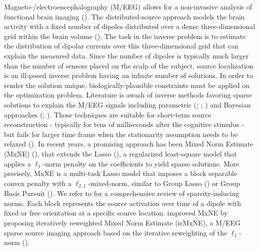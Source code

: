 Magneto-/electroencephalography (M/EEG) allows for a non-invasive analysis of
functional brain imaging (\cite{Baillet_Mosher_Leahy_2001}). The distributed-source approach models the brain activity
with a fixed number of dipoles distributed over a dense three-dimensional 
grid within the brain volume (\cite{Dale_Sereno_1993}). The task in the inverse problem is to estimate the 
distribution of dipolar currents over this three-dimensional grid that can explain the 
measured data. Since the number of dipoles is typically much larger than the number 
of sensors placed on the scalp of the subject, source localization is an 
ill-posed inverse problem having an infinite number of solutions. In order to render
the solution unique, biologically-plausible constraints must be applied on the optimization
problem. Literature is awash of inverse methods favoring sparse solutions to explain the
M/EEG signals including parametric (\cite{Huang_Breheny_Ma_2012}; \cite{Matsuura_Okabe_1995}; 
\cite{Uutela_Hamalainen_Somersalo_1999}) and Bayesian approaches (\cite{Costa_Batatia_Oberlin_DGiano_Tourneret_2017}; 
\cite{Oikonomou_Kompatsiaris_2020}). Those techniques are suitable for short-term source reconstruction 
- typically for tens of milliseconds after the cognitive stimulus - but fails for larger time frame when the 
stationarity assumption needs to be relaxed (\cite{Gramfort_Strohmeier_Haueisen_Hamalainen_Kowalski13}). 
In recent years, a promising approach has been Mixed Norm Estimate (MxNE) 
(\cite{Gramfort_Kowalski_Hamalainen12}), that extends the Lasso (\cite{Tibshirani96}), 
a regularized least-square model that applies a $\ell_1$-norm penalty on the coefficients to yield 
sparse solutions. More precisely, MxNE is a multi-task Lasso
model that imposes a block separable convex penalty with a $\ell_{2,1}$-mixed-norm, similar to 
Group Lasso (\cite{Yuan_Lin06}) or Group Basis Pursuit (\cite{Liao_Li_Carin_2014}). We refer to 
\cite{Bach_Jenatton_Mairal_Obozinski12} for a comprehensive review of sparsity-inducing norms. 
Each block represents the source activation over time of a dipole with fixed or free orientation at a specific source location.
\cite{Strohmeier_Bekhti_Haueisen_Gramfort_2016} improved MxNE by proposing iteratively reweighted Mixed Norm Estimate 
(irMxNE), a M/EEG sparse source imaging approach based on the iterative reweighting of the $\ell_1$-
norm (\cite{Candes_Wakin_Boyd08}).

